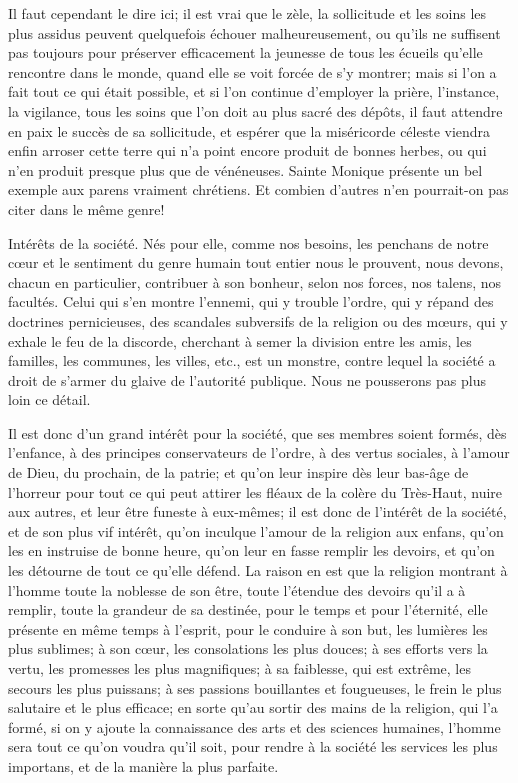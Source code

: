 \documentclass[instructions.tex]{subfiles}
\begin{document}
Il faut cependant le dire ici; il est vrai que le zèle, la sollicitude et les soins les plus assidus peuvent quelquefois échouer malheureusement, ou qu'ils ne suffisent pas toujours pour préserver efficacement la jeunesse de tous les écueils qu'elle rencontre dans le monde, quand elle se voit forcée de s'y montrer; mais si l'on a fait tout ce qui était possible, et si l'on continue d'employer la prière, l'instance, la vigilance, tous les soins que l'on doit au plus sacré des dépôts, il faut attendre en paix le succès de sa sollicitude, et espérer que la miséricorde céleste viendra enfin arroser cette terre qui n'a point encore produit de bonnes herbes, ou qui n'en produit presque plus que de vénéneuses. Sainte Monique présente un bel exemple aux parens vraiment chrétiens. Et combien d'autres n'en pourrait-on pas citer dans le même genre!
 
\tertio Intérêts de la société. Nés pour elle, comme nos besoins, les penchans de notre cœur et le sentiment du genre humain tout entier nous le prouvent, nous devons, chacun en particulier, contribuer à son bonheur, selon nos forces, nos talens, nos facultés. Celui qui s'en montre l'ennemi, qui y trouble l'ordre, qui y répand des doctrines pernicieuses, des scandales subversifs de la religion ou des mœurs, qui y exhale le feu de la discorde, cherchant à semer la division entre les amis, les familles, les communes, les villes, etc., est un monstre, contre lequel la société a droit de s'armer du glaive de l'autorité publique. Nous ne pousserons pas plus loin ce détail.
 
Il est donc d'un grand intérêt pour la société, que ses membres soient formés, dès l'enfance, à des principes conservateurs de l'ordre, à des vertus sociales, à l'amour de Dieu, du prochain, de la patrie; et qu'on leur inspire dès leur bas-âge de l'horreur pour tout ce qui peut attirer les fléaux de la colère du Très-Haut, nuire aux autres, et leur être funeste à eux-mêmes; il est donc de l'intérêt de la société, et de son plus vif intérêt, qu'on inculque l'amour de la religion aux enfans, qu'on les en instruise de bonne heure, qu'on leur en fasse remplir les devoirs, et qu'on les détourne de tout ce qu'elle défend. La raison en est que la religion montrant à l'homme toute la noblesse de son être, toute l'étendue des devoirs qu'il a à remplir, toute la grandeur de sa destinée, pour le temps et pour l'éternité, elle présente en même temps à l'esprit, pour le conduire à son but, les lumières les plus sublimes; à son cœur, les consolations les plus douces; à ses efforts vers la vertu, les promesses les plus magnifiques; à sa faiblesse, qui est extrême, les secours les plus puissans; à ses passions bouillantes et fougueuses, le frein le plus salutaire et le plus efficace; en sorte qu'au sortir des mains de la religion, qui l'a formé, si on y ajoute la connaissance des arts et des sciences humaines, l'homme sera tout ce qu'on voudra qu'il soit, pour rendre à la société les services les plus importans, et de la manière la plus parfaite.
 
\end{document}

